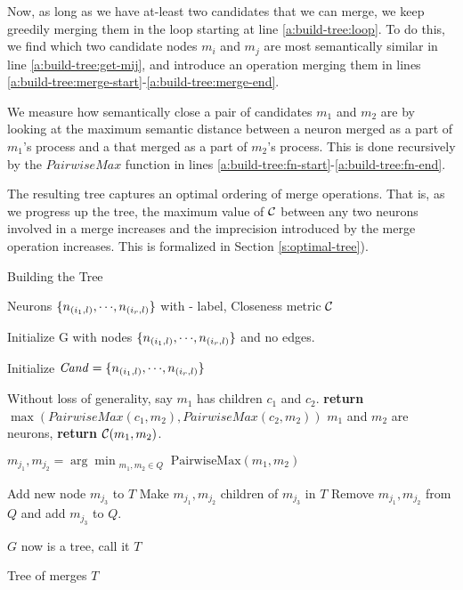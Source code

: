 Now, as long as we have at-least two candidates that we can merge, we keep
greedily merging them in the loop starting at line \ref{a:build-tree:loop}. To
do this, we find which two candidate nodes $m_i$ and $m_j$ are most semantically
similar in line \ref{a:build-tree:get-mij}, and introduce an operation merging
them in lines \ref{a:build-tree:merge-start}-\ref{a:build-tree:merge-end}.

We measure how semantically close a pair of candidates $m_1$ and $m_2$ are by
looking at the maximum semantic distance between a neuron merged as a part of
$m_1$'s process and a that merged as a part of $m_2$'s process. This is done
recursively by the $\mathit{PairwiseMax}$ function in lines
\ref{a:build-tree:fn-start}-\ref{a:build-tree:fn-end}.

The resulting tree captures an optimal ordering of merge operations. 
That is, as we progress up the tree, the maximum value of $\mathcal{C}$ between any two
neurons involved in a merge increases and the imprecision
introduced by the merge operation increases. 
This is formalized in Section \ref{s:optimal-tree}). 

\begin{algorithm}
\caption{Building the Tree}
\label{a:build-tree}
\begin{algorithmic}[1]

    \Require Neurons $\{n_{(i_1,l)}, {\cdots}, n_{(i_r,l)}\}$ with \inc-\dec
    label, Closeness metric $\mathcal{C}$

    
    \State Initialize G with nodes $\{ n_{(i_1,l)}, {\cdots}, n_{(i_r,l)} \}$
    and no edges. \label{a:build-tree:init}

    \State Initialize $\mathit{Cand}=\{ n_{(i_1,l)}, {\cdots}, n_{(i_r,l)} \}$
    \label{a:build-tree:init-cand}

     \label{a:build-tree:fn-start}
        
            \State Without loss of generality, say $m_1$ has children $c_1$ and
            $c_2$. 
            \State \textbf{return} $\max( PairwiseMax( c_1, m_2 ), PairwiseMax(
            c_2, m_2 ) )$
        \Else
            \State $m_1$ and $m_2$ are neurons, \textbf{return} $\mathcal{C}( m_1, m_2 )$.
        \EndIf

    \EndFunction \label{a:build-tree:fn-end}

     \label{a:build-tree:loop}
    
        \State $m_{j_1}, m_{j_2} = \arg\min_{\substack{m_1, m_2 \in Q}} 
            \text{PairwiseMax}(m_1, m_2)$ \label{a:build-tree:get-mij}

        \State Add new node $m_{j_3}$ to $T$ \label{a:build-tree:merge-start}
        \State Make $m_{j_1}, m_{j_2}$ children of $m_{j_3}$ in $T$
        \State Remove $m_{j_1}, m_{j_2}$ from $Q$ and add $m_{j_3}$ to $Q$.
            \label{a:build-tree:merge-end}
    \EndWhile

    \State $G$ now is a tree, call it $T$

    \Ensure Tree of merges $T$
\end{algorithmic}
\end{algorithm}

